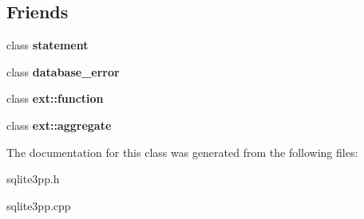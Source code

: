 \subsection*{Friends}
\begin{DoxyCompactItemize}
\item 
\hypertarget{classsqlite3pp_1_1database_a4682195a7dfc5da7346d8cfadcf0eb20}{class {\bfseries statement}}\label{classsqlite3pp_1_1database_a4682195a7dfc5da7346d8cfadcf0eb20}

\item 
\hypertarget{classsqlite3pp_1_1database_a76d8b698f6b190905b6c9f75fc581f93}{class {\bfseries database\-\_\-error}}\label{classsqlite3pp_1_1database_a76d8b698f6b190905b6c9f75fc581f93}

\item 
\hypertarget{classsqlite3pp_1_1database_a0af2b37d4b82567629796c72049d6e6e}{class {\bfseries ext\-::function}}\label{classsqlite3pp_1_1database_a0af2b37d4b82567629796c72049d6e6e}

\item 
\hypertarget{classsqlite3pp_1_1database_a3daeb4aba0850368a48e8024f05d4863}{class {\bfseries ext\-::aggregate}}\label{classsqlite3pp_1_1database_a3daeb4aba0850368a48e8024f05d4863}

\end{DoxyCompactItemize}


The documentation for this class was generated from the following files\-:\begin{DoxyCompactItemize}
\item 
sqlite3pp.\-h\item 
sqlite3pp.\-cpp\end{DoxyCompactItemize}
